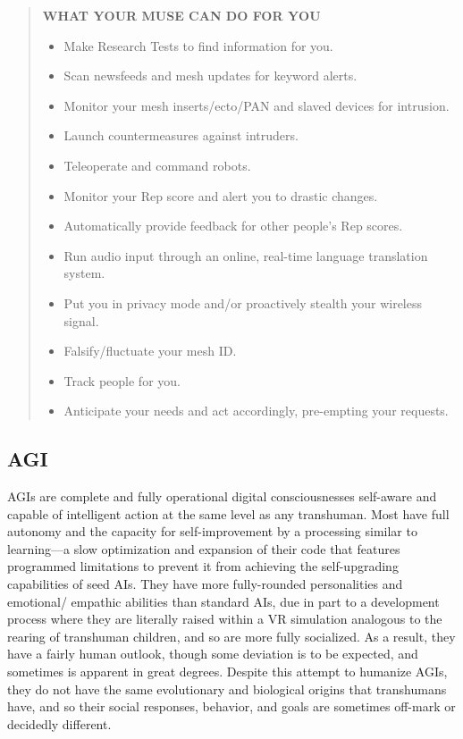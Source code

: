\begin{quotation}
\textbf{WHAT YOUR MUSE CAN DO FOR YOU}
\begin{itemize}
\item Make Research Tests to find information for you.
\item Scan newsfeeds and mesh updates for keyword alerts.
\item Monitor your mesh inserts/ecto/PAN and slaved devices for intrusion.
\item Launch countermeasures against intruders.
\item Teleoperate and command robots.
\item Monitor your Rep score and alert you to drastic changes.
\item Automatically provide feedback for other people’s Rep scores.
\item Run audio input through an online, real-time language translation system.
\item Put you in privacy mode and/or proactively stealth your wireless signal.
\item Falsify/fluctuate your mesh ID.
\item Track people for you.
\item Anticipate your needs and act accordingly, pre-empting your requests.
\end{itemize}
\end{quotation}

\subsection{AGI}

AGIs are complete and fully operational digital consciousnesses
self-aware and capable of intelligent
action at the same level as any transhuman. Most have 
full autonomy and the capacity for self-improvement 
by a processing similar to learning—a slow optimization
and expansion of their code that features
programmed limitations to prevent it from achieving
the self-upgrading capabilities of seed AIs. They
have more fully-rounded personalities and emotional/
empathic abilities than standard AIs, due in part to 
a development process where they are literally raised 
within a VR simulation analogous to the rearing of 
transhuman children, and so are more fully socialized. 
As a result, they have a fairly human outlook, though 
some deviation is to be expected, and sometimes is 
apparent in great degrees. Despite this attempt to humanize
AGIs, they do not have the same evolutionary
and biological origins that transhumans have, and so 
their social responses, behavior, and goals are sometimes
off-mark or decidedly different.

